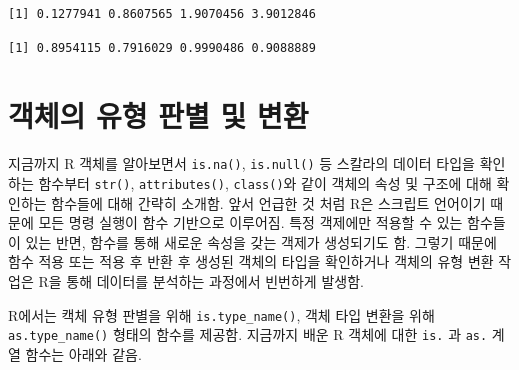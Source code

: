 \documentclass[
  11pt,
]{krantz}
\begin{document}
\begin{verbatim}
[1] 0.1277941 0.8607565 1.9070456 3.9012846
\end{verbatim}

\begin{verbatim}
[1] 0.8954115 0.7916029 0.9990486 0.9088889
\end{verbatim}

\normalsize

\hypertarget{is-as-function}{%
\section{객체의 유형 판별 및 변환}\label{is-as-function}}

지금까지 R 객체를 알아보면서 \texttt{is.na()}, \texttt{is.null()} 등 스칼라의 데이터 타입을 확인하는 함수부터 \texttt{str()}, \texttt{attributes()}, \texttt{class()}와 같이 객체의 속성 및 구조에 대해 확인하는 함수들에 대해 간략히 소개함. 앞서 언급한 것 처럼 R은 스크립트 언어이기 때문에 모든 명령 실행이 함수 기반으로 이루어짐. 특정 객제에만 적용할 수 있는 함수들이 있는 반면, 함수를 통해 새로운 속성을 갖는 객제가 생성되기도 함. 그렇기 때문에 함수 적용 또는 적용 후 반환 후 생성된 객체의 타입을 확인하거나 객체의 유형 변환 작업은 R을 통해 데이터를 분석하는 과정에서 빈번하게 발생함.

R에서는 캑체 유형 판별을 위해 \texttt{is.type\_name()}, 객체 타입 변환을 위해 \texttt{as.type\_name()} 형태의 함수를 제공함. 지금까지 배운 R 객체에 대한 \texttt{is.} 과 \texttt{as.} 계열 함수는 아래와 같음.

\footnotesize
\end{document}
